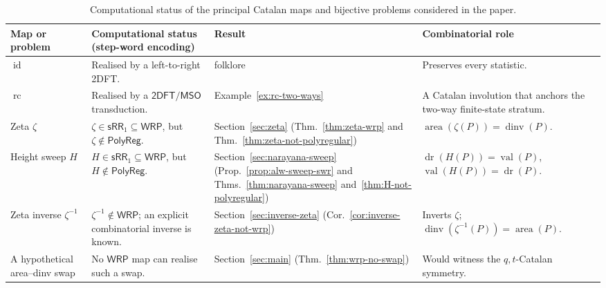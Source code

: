 \documentclass[11pt]{article}
\theoremstyle{definition}
\newcommand{\WRP}{\mathsf{WRP}}
\newcommand{\SWR}{\mathsf{sRR}_1}
\newcommand{\TDFT}{\mathsf{2DFT}}
\newcommand{\MSO}{\mathsf{MSO}}
\newcommand{\area}{\operatorname{area}}
\newcommand{\dinv}{\operatorname{dinv}}
\newcommand{\val}{\operatorname{val}}
\newcommand{\dr}{\operatorname{dr}}
\newcommand{\polyreg}{\mathsf{PolyReg}}
\newcommand{\id}{\operatorname{id}}
\newcommand{\rc}{\operatorname{rc}}
\begin{document}
\begin{table}[t]
\centering
\small
\renewcommand{\arraystretch}{1.25}
\begin{tabularx}{\textwidth}{@{}>{\raggedright\arraybackslash}p{}
                                   >{\raggedright\arraybackslash}X
                                   >{\raggedright\arraybackslash}p{}
                                   >{\raggedright\arraybackslash}X@{}}
\toprule
Map or problem & Computational status (step-word encoding) & Result &
  Combinatorial role \\
\midrule
$\id$ & Realised by a left-to-right 2DFT. & folklore &
  Preserves every statistic. \\
$\rc$ & Realised by a $\TDFT/\MSO$ transduction. &
  Example~\ref{ex:rc-two-ways} &
  A Catalan involution that anchors the two-way finite-state stratum. \\
Zeta $\zeta$ &
  $\zeta\in\SWR\subseteq\WRP$, but $\zeta\notin\polyreg$. &
  Section~\ref{sec:zeta}
  (Thm.~\ref{thm:zeta-wrp} and
  Thm.~\ref{thm:zeta-not-polyregular}) &
  $\area(\zeta(P))=\dinv(P)$. \\
Height sweep $H$ &
  $H\in\SWR\subseteq\WRP$, but $H\notin\polyreg$. &
  Section~\ref{sec:narayana-sweep}
  (Prop.~\ref{prop:alw-sweep-swr} and
  Thms.~\ref{thm:narayana-sweep} and~\ref{thm:H-not-polyregular}) &
  $\dr(H(P))=\val(P)$, $\val(H(P))=\dr(P)$. \\
Zeta inverse $\zeta^{-1}$ &
  $\zeta^{-1}\notin\WRP$; an explicit combinatorial inverse is known. &
  Section~\ref{sec:inverse-zeta}
  (Cor.~\ref{cor:inverse-zeta-not-wrp}) &
  Inverts $\zeta$; $\dinv(\zeta^{-1}(P))=\area(P)$. \\
A hypothetical area--dinv swap &
  No $\WRP$ map can realise such a swap. &
  Section~\ref{sec:main} (Thm.~\ref{thm:wrp-no-swap}) &
  Would witness the $q,t$-Catalan symmetry. \\
\bottomrule
\end{tabularx}
\caption{Computational status of the principal Catalan maps and bijective
problems considered in the paper.}
\label{tab:landscape}
\end{table}
\end{document}
